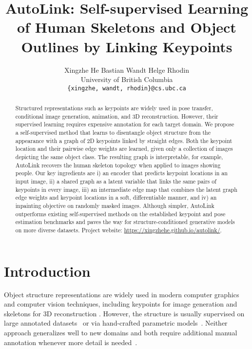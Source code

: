 \documentclass{article}
\title{AutoLink: Self-supervised Learning of Human Skeletons and Object Outlines by Linking Keypoints}
\author{Xingzhe He \hspace{5mm} Bastian Wandt \hspace{5mm} Helge Rhodin \\
University of British Columbia\\
{\tt\small \{xingzhe, wandt, rhodin\}@cs.ubc.ca}}
\begin{document}
\maketitle
\begin{abstract}
Structured representations such as keypoints are widely used in pose transfer, conditional image generation, animation, and 3D reconstruction.
However, their supervised learning requires expensive annotation for each target domain.
We propose a self-supervised method that learns to disentangle object structure from the appearance with a graph of 2D keypoints linked by straight edges. 
Both the keypoint location and their pairwise edge weights are learned, given only a collection of images depicting the same object class. The resulting graph is interpretable, for example, AutoLink recovers the human skeleton topology when applied to images showing people.
Our key ingredients are i) an encoder that predicts keypoint locations in an input image, ii) a shared graph as a latent variable that links the same pairs of keypoints in every image, iii) an intermediate edge map that combines the latent graph edge weights and keypoint locations in a soft, differentiable manner, and iv)
an inpainting objective on randomly masked images.
Although simpler, 
AutoLink outperforms existing self-supervised methods on the established keypoint and pose estimation benchmarks 
and paves the way for structure-conditioned generative models on more diverse datasets.
Project website: \url{https://xingzhehe.github.io/autolink/}.
\end{abstract} \section{Introduction}

Object structure representations are widely used in modern computer graphics and computer vision techniques, including keypoints for image generation \cite{ma2017pose, ma2018disentangled, siarohin2018deformable} and skeletons for 3D reconstruction \cite{feng2018joint, jackson2017large, yu2017bodyfusion, pavlakos2019expressive, su2021anerf}.
However, the structure is usually supervised on large annotated datasets~\cite{lin2014microsoft, andriluka14cvpr, PoseTrack, mono3dhp2017} or via hand-crafted parametric models~\cite{SMPL2015, SMPLX2019, Xu2020ghum, osman2020star, blanz1999morphable, FLAME:SiggraphAsia2017}. Neither approach generalizes well to new domains and both require additional manual annotation whenever more detail is needed~\cite{Guler2018DensePose}. 
\end{document}
